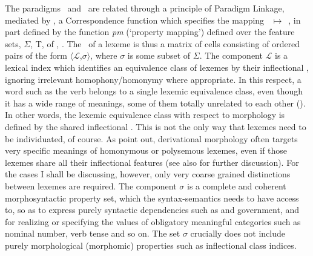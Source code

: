 \documentclass[output=paper,colorlinks,citecolor=brown]{langscibook}
\begin{document}
The paradigms \PC\ and \PF\ are related through a principle of Paradigm Linkage, mediated by  \Corr, a Correspondence function which specifies the mapping \mbox{\PC\ $\mapsto$ \PF}, in part defined by the function \textit{pm} (`property mapping') defined over the feature sets, $\Sigma$, T, of \PC, \PF. The \PC\  of a lexeme is thus a matrix of cells consisting of ordered pairs of the form $\langle$$\mathcal{L}$,$\sigma$$\rangle$, where $\sigma$ is some subset of $\Sigma$. The component $\mathcal{L}$ is a lexical index which identifies an equivalence class of lexemes by their inflectional , ignoring irrelevant homophony/homonymy where appropriate. In this respect, a word such as the  verb  belongs to a single lexemic equivalence class, even though it has a wide range of meanings, some of them totally unrelated to each other (). In other words, the lexemic equivalence class with respect to morphology is defined by the shared inflectional . This is not the only way that lexemes need to be individuated, of course. As \citet{fradin2003} point out, derivational morphology often targets very specific meanings of homonymous or polysemous lexemes, even if those lexemes share all their inflectional features (see also \citealt{bonamicrysmann2017} for further discussion). For the cases I shall be discussing, however, only very coarse grained distinctions  between lexemes are required. The component $\sigma$ is a complete and coherent morphosyntactic property set, which the syntax-semantics needs to have access to, so as to express purely syntactic dependencies such as  and government, and for realizing or specifying the values of obligatory meaningful categories such as nominal number, verb tense and so on. The set $\sigma$ crucially does not include purely morphological (morphomic) properties such as inflectional class indices.
\end{document}
